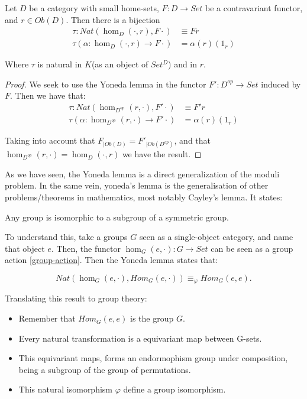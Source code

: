 \begin{corollary}
  Let $D$ be a category with small home-sets, $F:D\to Set$ be a contravariant functor, and $r\in Ob(D)$. Then there is a bijection
  \begin{align*}
    \tau:Nat(\hom_D(\cdot,r), F\cdot) &\equiv Fr\\
    \tau(\alpha:\hom_D(\cdot,r)\to F\cdot)& = \alpha(r)(1_r)
  \end{align*}
  
  Where $\tau$ is natural in $K$(as an object of $Set^{D}$) and in $r$.
\end{corollary}
\begin{proof}
We seek to use the Yoneda lemma in the functor $F':D^{op}\to Set$ induced by $F$. Then we have that: 
  \begin{align*}
    \tau:Nat(\hom_{D^{op}}(r,\cdot), F'\cdot) &\equiv F'r\\
    \tau(\alpha:\hom_{D^{op}}(r,\cdot)\to F'\cdot)& = \alpha(r)(1_r)
  \end{align*}

  Taking into account that $F_{|Ob(D)}=F'_{|Ob(D^{op})}$, and that 
  $\hom_{D^{op}}(r,\cdot) = \hom_D(\cdot,r)$ we have the result.
\end{proof}

As we have seen, the Yoneda lemma is a direct generalization of the moduli problem. In the same vein, yoneda's lemma is the generalisation of other problems/theorems in mathematics, most notably Cayley's lemma. It states:
\begin{proposition} \label{Cayleys}
Any group is isomorphic to a subgroup of a symmetric group.
\end{proposition}

To understand this, take a groups $G$ seen as a single-object category, and name that object $e$. Then, the functor $\hom_G(e, \cdot): G \to Set$ can be seen as a group action \ref{group-action}. Then the Yoneda lemma states that:

$$Nat(\hom_G(e,\cdot), Hom_G(e,\cdot)) \equiv_\varphi Hom_G(e,e).$$

Translating this result to group theory:
\begin{itemize}
\item Remember that $Hom_G(e,e)$ is the group $G$.
\item Every natural transformation is a equivariant map between G-sets.
\item This equivariant maps, forms an endormophism group under composition, being a subgroup of the group of permutations.
\item This natural isomorphism $\varphi$ define a group isomorphism.
\end{itemize}

